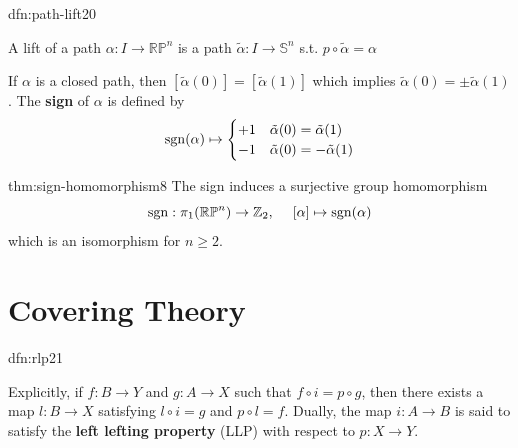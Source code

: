 \documentclass[landscape, 8pt]{extarticle}
\begin{document}
\begin{multicols*}{3}
\vspace{-7pt}
\begin{dfn}{dfn:path-lift}{20}
	\begin{itemize-zero}
	    \item A lift of a path $\alpha : I \to \mathbb{RP}^{n}$ is a path $\tilde{\alpha} : I \to \mathbb{S}^{n}$ s.t. $p \circ \tilde{\alpha} = \alpha$
	    \item If $\alpha$ is a closed path, then $[\tilde{\alpha}(0)] = [\tilde{\alpha}(1)]$ which implies $\tilde{\alpha}(0) = \pm \tilde{\alpha}(1)$. The \textbf{sign} of $\alpha$ is defined by
			\[\operatorname{sgn}(\alpha) \mapsto \begin{cases}
				+1 & \tilde{\alpha}(0) = \tilde{\alpha}(1) \\
				-1 & \tilde{\alpha}(0) = -\tilde{\alpha}(1)
			\end{cases}\]
	\end{itemize-zero}

\end{dfn}

\vspace{-7pt}
\begin{thm}{thm:sign-homomorphism}{8}
	\vspace{-2pt}
	The sign induces a surjective group homomorphism
	\[\operatorname{sgn} : \pi_{1}(\mathbb{RP}^{n}) \to \mathbb{Z}_{2},\;\quad [\alpha] \mapsto \operatorname{sgn}(\alpha)\]
	which is an isomorphism for $n \ge 2$.
\end{thm}

\section{Covering Theory}
\vspace{-3pt}
\begin{dfn}{dfn:rlp}{21}
	\vspace{-2pt}
	{
	}
Explicitly, if $f : B \to Y$ and $g : A \to X$ such that $f \circ i = p \circ g$, then there exists a map $l : B \to X$ satisfying $l \circ i = g$ and $p \circ l = f$. Dually, the map $i : A \to B$ is said to satisfy the \textbf{left lefting property} (LLP) with respect to $p : X \to Y$.
\end{dfn}


\end{multicols*}
\end{document}
